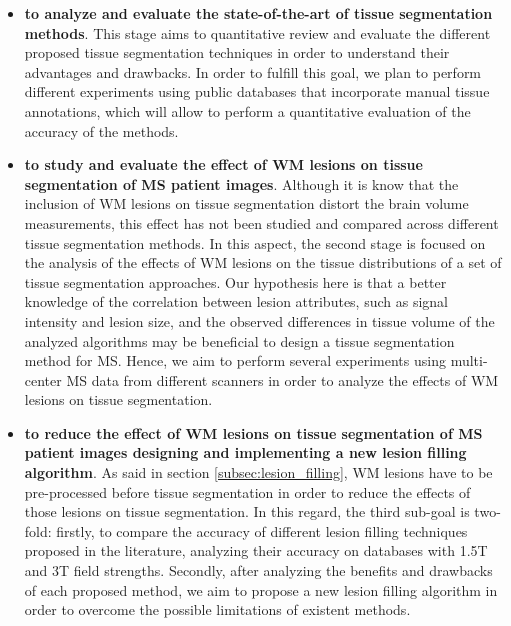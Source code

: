 \begin{itemize}

\item \textbf{to analyze and evaluate the state-of-the-art of tissue segmentation methods}. This stage aims to quantitative review and evaluate the different proposed tissue segmentation techniques in order to understand their advantages and drawbacks. In order to fulfill this goal, we plan to perform different experiments using public databases that incorporate manual tissue annotations, which will allow to perform a quantitative evaluation of the accuracy of the methods. 
  
\item \textbf{to study and evaluate the effect of WM lesions on tissue segmentation of MS patient images}. Although it is know that the inclusion of WM lesions on tissue segmentation distort the brain volume measurements, this effect has not been studied and compared across different tissue segmentation methods. In this aspect, the second stage is focused on the analysis of the effects of WM lesions on the tissue distributions of a set of tissue segmentation approaches. Our hypothesis here is that a better knowledge of the correlation between lesion attributes, such as signal intensity and lesion size, and the observed differences in tissue volume of the analyzed algorithms may be beneficial to design a tissue segmentation method for MS. Hence, we aim to perform several experiments using multi-center MS data from different scanners in order to analyze the effects of WM lesions on tissue segmentation.

\item \textbf{to reduce the effect of WM lesions on tissue segmentation of MS patient images designing and implementing a new lesion filling algorithm}. As said in section \ref{subsec:lesion_filling}, WM lesions have to be pre-processed before tissue segmentation in order to reduce the effects of those lesions on tissue segmentation. In this regard, the third sub-goal is two-fold: firstly, to compare the accuracy of different lesion filling techniques proposed in the literature, analyzing their accuracy on databases with 1.5T and 3T field strengths. Secondly, after analyzing the benefits and drawbacks of each proposed method, we aim to propose a new lesion filling algorithm in order to overcome the possible limitations of existent methods.


\end{itemize}

